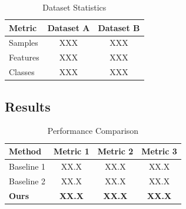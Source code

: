 \documentclass[macnew, en]{manuscript}
\begin{document}
\begin{table}[t]
    \centering
    \caption{Dataset Statistics}
    \label{tab:data}
    \begin{tabular}{lcc}
        \toprule
        Metric & Dataset A & Dataset B \\
        \midrule
        Samples & XXX & XXX \\
        Features & XXX & XXX \\
        Classes & XXX & XXX \\
        \bottomrule
    \end{tabular}
\end{table}

\subsection{Results}
\label{subsec:results}

\begin{table}[t]
    \centering
    \caption{Performance Comparison}
    \label{tab:results}
    \begin{tabular}{lccc}
        \toprule
        Method & Metric 1 & Metric 2 & Metric 3 \\
        \midrule
        Baseline 1 & XX.X & XX.X & XX.X \\
        Baseline 2 & XX.X & XX.X & XX.X \\
        \textbf{Ours} & \textbf{XX.X} & \textbf{XX.X} & \textbf{XX.X} \\
        \bottomrule
    \end{tabular}
\end{table}
\end{document}
